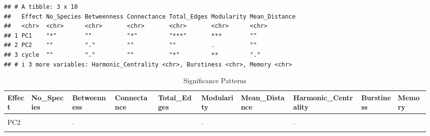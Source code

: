 \documentclass[
]{article}
\begin{document}
\begin{verbatim}
## # A tibble: 3 x 10
##   Effect No_Species Betweenness Connectance Total_Edges Modularity Mean_Distance
##   <chr>  <chr>      <chr>       <chr>       <chr>       <chr>      <chr>        
## 1 PC1    "*"        ""          "*"         "***"       ***        ""           
## 2 PC2    ""         "."         ""          ""          .          ""           
## 3 cycle  ""         "."         ""          "*"         **         "."          
## # i 3 more variables: Harmonic_Centrality <chr>, Burstiness <chr>, Memory <chr>
\end{verbatim}

\begin{table}[!h]
\centering
\caption{\label{tab:unnamed-chunk-4}Significance Patterns}
\centering
\begin{tabular}[t]{llllllllll}
\toprule
Effect & No\_Species & Betweenness & Connectance & Total\_Edges & Modularity & Mean\_Distance & Harmonic\_Centrality & Burstiness & Memory\\
\midrule
\cellcolor{gray!10}{PC1} & \cellcolor{gray!10}{*} & \cellcolor{gray!10}{} & \cellcolor{gray!10}{*} & \cellcolor{gray!10}{***} & \cellcolor{gray!10}{***} & \cellcolor{gray!10}{} & \cellcolor{gray!10}{.} & \cellcolor{gray!10}{} & \cellcolor{gray!10}{}\\
PC2 &  & . &  &  & . &  & . &  & \\
\cellcolor{gray!10}{cycle} & \cellcolor{gray!10}{} & \cellcolor{gray!10}{.} & \cellcolor{gray!10}{} & \cellcolor{gray!10}{*} & \cellcolor{gray!10}{**} & \cellcolor{gray!10}{.} & \cellcolor{gray!10}{*} & \cellcolor{gray!10}{} & \cellcolor{gray!10}{}\\
\bottomrule
\end{tabular}
\end{table}
\end{document}
